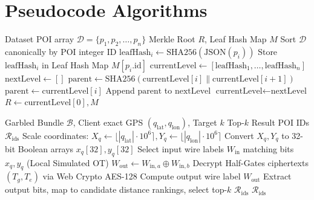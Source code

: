 \documentclass[12pt,a4paper,oneside]{report}
\begin{document}
\section{Pseudocode Algorithms}

\begin{algorithm}[H]
\caption{Dataset Merkle Commitment Construction (Server-Side)}
\begin{algorithmic}[1]
\Require Dataset POI array $\mathcal{D} = \{p_1, p_2, \dots, p_n\}$
\Ensure Merkle Root $R$, Leaf Hash Map $M$
\State Sort $\mathcal{D}$ canonically by POI integer ID
    \State $\text{leafHash}_i \leftarrow \text{SHA256}(\text{JSON}(p_i))$
    \State Store $\text{leafHash}_i$ in Leaf Hash Map $M[p_i.\text{id}]$
\EndFor
\State $\text{currentLevel} \leftarrow [\text{leafHash}_1, \dots, \text{leafHash}_n]$
    \State $\text{nextLevel} \leftarrow []$
            \State $\text{parent} \leftarrow \text{SHA256}(\text{currentLevel}[i] \parallel \text{currentLevel}[i+1])$
        \Else
            \State $\text{parent} \leftarrow \text{currentLevel}[i]$ 
        \EndIf
        \State Append $\text{parent}$ to $\text{nextLevel}$
    \EndFor
    \State $\text{currentLevel} \leftarrow \text{nextLevel}$
\EndWhile
\State \Return $R \leftarrow \text{currentLevel}[0], M$
\end{algorithmic}
\end{algorithm}

\begin{algorithm}[H]
\caption{Client-Side Garbled Circuit Evaluation}
\begin{algorithmic}[1]
\Require Garbled Bundle $\mathcal{B}$, Client exact GPS $(q_{\text{lat}}, q_{\text{lon}})$, Target $k$
\Ensure Top-$k$ Result POI IDs $\mathcal{R}_{\text{ids}}$
\State Scale coordinates: $X_q \leftarrow \lfloor |q_{\text{lat}}| \cdot 10^6 \rceil, Y_q \leftarrow \lfloor |q_{\text{lon}}| \cdot 10^6 \rceil$
\State Convert $X_q, Y_q$ to 32-bit Boolean arrays $x_q[32], y_q[32]$
\State Select input wire labels $W_{\text{in}}$ matching bits $x_q, y_q$ (Local Simulated OT)
        \State $W_{\text{out}} \leftarrow W_{\text{in},a} \oplus W_{\text{in},b}$ 
    \Else
        \State Decrypt Half-Gates ciphertexts $(T_g, T_e)$ via Web Crypto AES-128
        \State Compute output wire label $W_{\text{out}}$
    \EndIf
\EndFor
\State Extract output bits, map to candidate distance rankings, select top-$k$ $\mathcal{R}_{\text{ids}}$
\State \Return $\mathcal{R}_{\text{ids}}$
\end{algorithmic}
\end{algorithm}
\end{document}
